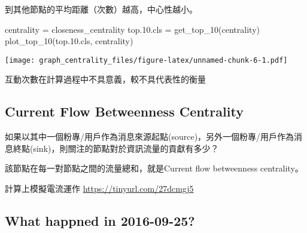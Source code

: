 \documentclass[
]{article}
\newenvironment{Shaded}{\begin{snugshade}}{\end{snugshade}}
\newcommand{\FloatTok}[1]{\textcolor[rgb]{0.00,0.00,0.81}{#1}}
\newcommand{\FunctionTok}[1]{\textcolor[rgb]{0.00,0.00,0.00}{#1}}
\newcommand{\NormalTok}[1]{#1}
\newcommand{\OtherTok}[1]{\textcolor[rgb]{0.56,0.35,0.01}{#1}}
\newcommand{\StringTok}[1]{\textcolor[rgb]{0.31,0.60,0.02}{#1}}
\begin{document}
到其他節點的平均距離（次數）越高，中心性越小。

\begin{Shaded}
\begin{Highlighting}[]
\NormalTok{centrality }\OtherTok{=} \StringTok{\textquotesingle{}closeness\_centrality\textquotesingle{}}
\NormalTok{top.}\FloatTok{10.}\NormalTok{cls }\OtherTok{=} \FunctionTok{get\_top\_10}\NormalTok{(centrality)}
\FunctionTok{plot\_top\_10}\NormalTok{(top.}\FloatTok{10.}\NormalTok{cls, centrality)}
\end{Highlighting}
\end{Shaded}

\texttt{[image: graph\_centrality\_files/figure-latex/unnamed-chunk-6-1.pdf]}

互動次數在計算過程中不具意義，較不具代表性的衡量

\hypertarget{current-flow-betweenness-centrality}{%
\subsection{Current Flow Betweenness
Centrality}\label{current-flow-betweenness-centrality}}

如果以其中一個粉專/用戶作為消息來源起點(source)，另外一個粉專/用戶作為消息終點(sink)，則關注的節點對於資訊流量的貢獻有多少？

該節點在每一對節點之間的流量總和，就是Current flow betweenness
centrality。

計算上模擬電流運作 \url{https://tinyurl.com/27dcmgj5}

\hypertarget{what-happned-in-2016-09-25}{%
\subsection{What happned in
2016-09-25?}\label{what-happned-in-2016-09-25}}
\end{document}
